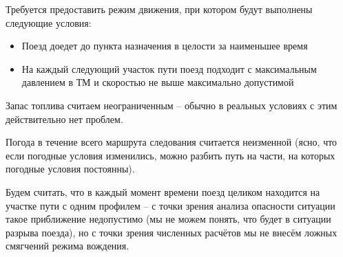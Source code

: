 Требуется предоставить режим движения, при котором будут выполнены следующие условия:
\begin{itemize}
\item Поезд доедет до пункта назначения в целости за наименьшее время
\item На каждый следующий участок пути поезд подходит с максимальным давлением в ТМ и скоростью не выше максимально допустимой
\end{itemize}


Запас топлива считаем неограниченным -- обычно в реальных условиях с этим действительно нет проблем.

Погода в течение всего маршрута следования считается неизменной (ясно, что если погодные условия изменились, можно разбить путь на части, на которых погодные условия постоянны).

Будем считать, что в каждый момент времени поезд целиком находится на участке пути с одним профилем -- с точки зрения анализа опасности ситуации такое приближение недопустимо (мы не можем понять, что будет в ситуации разрыва поезда), но с точки зрения численных расчётов мы не внесём ложных смягчений режима вождения.

